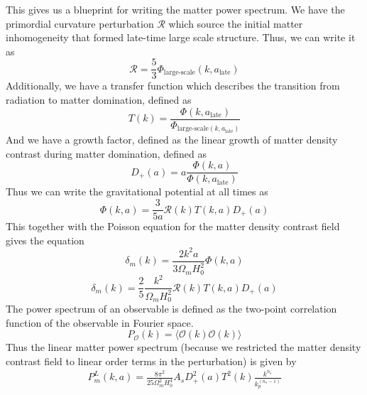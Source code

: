 This gives us a blueprint for writing the matter power spectrum. We have the primordial curvature perturbation $\mathcal{R}$ which source the initial matter inhomogeneity that formed late-time large scale structure. Thus, we can write it as
\begin{equation}
	\mathcal{R} = \frac{5}{3}\Phi_{\text{large-scale}}(k,a_{\text{late}})
\end{equation} 
Additionally, we have a transfer function which describes the transition from radiation to matter domination, defined as
\begin{equation}
	T(k) = \frac{\Phi(k,a_{\text{late}})}{\Phi_{\text{large-scale}(k,a_{\text{late}})}}
\end{equation}
And we have a growth factor, defined as the linear growth of matter density contrast during matter domination, defined as
\begin{equation}
	D_+(a) = a \frac{\Phi(k,a)}{\Phi(k,a_{\text{late}})}
\end{equation}
Thus we can write the gravitational potential at all times as
\begin{equation}
	\Phi(k,a) = \frac{3}{5a}\mathcal{R}(k)T(k,a)D_+(a)
\end{equation}
This together with the Poisson equation for the matter density contrast field gives the equation
\begin{equation}
	\delta_m(k) = \frac{2k^2a}{3\Omega_mH_0^2}\Phi(k,a)
\end{equation}
\begin{equation}
	\delta_m(k) = \frac{2}{5}\frac{k^2}{\Omega_mH_0^2}\mathcal{R}(k)T(k,a)D_+(a)
\end{equation}
The power spectrum of an observable is defined as the two-point correlation function of the observable in Fourier space.
\begin{equation}
	P_\mathcal{O}(k) = \langle \mathcal{O}(k)\mathcal{O}(k) \rangle
\end{equation}
Thus the linear matter power spectrum (because we restricted the matter density contrast field to linear order terms in the perturbation) is given by
\begin{equation}
	\begin{split}
		P_m^{L}(k,a) = \frac{8\pi^2}{25 \Omega_m^2 H_0^4} A_s D_+^2(a)T^2(k)\frac{k^{n_s}}{k_p^{(n_s-1)}}
	\end{split}
\end{equation}

